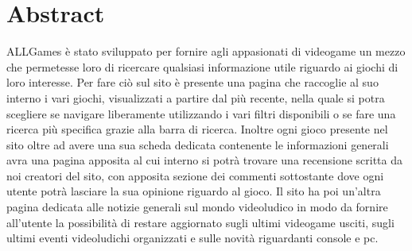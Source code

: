 \section*{Abstract}

ALLGames è stato sviluppato per fornire agli appasionati di videogame un mezzo che permetesse loro di ricercare qualsiasi informazione utile riguardo ai giochi di loro interesse.
Per fare ciò sul sito è presente una pagina che raccoglie al suo interno i vari giochi, visualizzati a partire dal più recente, nella quale si potra scegliere se navigare liberamente utilizzando i vari filtri disponibili o se fare una ricerca più specifica grazie alla barra di ricerca.
Inoltre ogni gioco presente nel sito oltre ad avere una sua scheda dedicata contenente le informazioni generali avra una pagina apposita al cui interno si potrà trovare una recensione scritta da noi creatori del sito, con apposita sezione dei commenti sottostante dove ogni utente potrà lasciare la sua opinione riguardo al gioco.
Il sito ha poi un'altra pagina dedicata alle notizie generali sul mondo videoludico in modo da fornire all'utente la possibilità di restare aggiornato sugli ultimi videogame usciti, sugli ultimi eventi videoludichi organizzati e sulle novità riguardanti console e pc.